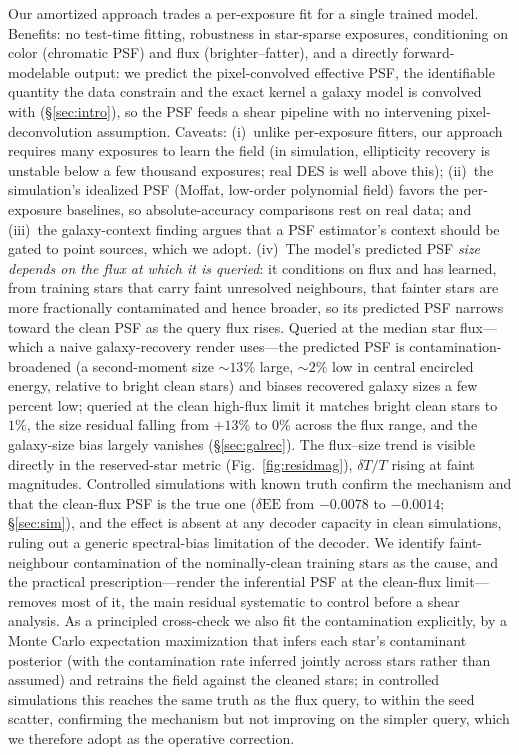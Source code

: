 \documentclass[twocolumn]{aastex701}
\begin{document}
Our amortized approach trades a per-exposure fit for a single trained model. Benefits: no
test-time fitting, robustness in star-sparse exposures, conditioning on color
(chromatic PSF) and flux (brighter--fatter), and a directly forward-modelable output: we
predict the pixel-convolved effective PSF, the identifiable quantity the data constrain
and the exact kernel a galaxy model is convolved with (\S\ref{sec:intro}), so the PSF
feeds a shear pipeline with no intervening pixel-deconvolution assumption. Caveats: (i)~unlike per-exposure fitters, our
approach requires many exposures to learn the field (in simulation, ellipticity
recovery is unstable below a few thousand exposures; real DES is well above this);
(ii)~the simulation's idealized PSF (Moffat, low-order polynomial field) favors the
per-exposure baselines, so absolute-accuracy comparisons rest on real data; and
(iii)~the galaxy-context finding argues that a PSF estimator's context should be gated to
point sources, which we adopt. (iv)~The model's predicted PSF \emph{size depends on the
flux at which it is queried}: it conditions on flux and has learned, from training stars
that carry faint unresolved neighbours, that fainter stars are more fractionally
contaminated and hence broader, so its predicted PSF narrows toward the clean PSF as the
query flux rises. Queried at the median star flux---which a naive galaxy-recovery render
uses---the predicted PSF is contamination-broadened (a second-moment size ${\sim}13\%$
large, ${\sim}2\%$ low in central encircled energy, relative to bright clean stars) and
biases recovered galaxy sizes a few percent low; queried at the clean high-flux limit it
matches bright clean stars to $1\%$, the size residual falling from $+13\%$ to $0\%$ across
the flux range, and the galaxy-size bias largely vanishes (\S\ref{sec:galrec}). The
flux--size trend is visible directly in the reserved-star metric (Fig.~\ref{fig:residmag}),
$\delta T/T$ rising at faint magnitudes. Controlled simulations with known truth confirm the
mechanism and that the clean-flux PSF is the true one ($\delta\mathrm{EE}$ from $-0.0078$ to
$-0.0014$; \S\ref{sec:sim}), and the effect is absent at any decoder capacity in clean
simulations, ruling out a generic spectral-bias limitation of the decoder. We identify
faint-neighbour contamination of the nominally-clean training stars as the cause, and the
practical prescription---render the inferential PSF at the clean-flux limit---removes most
of it, the main residual systematic to control before a shear analysis. As a principled
cross-check we also fit the contamination explicitly, by a Monte Carlo expectation
maximization \citep{dempster1977em,wei1990mcem} that infers each star's contaminant
posterior (with the contamination rate inferred jointly across stars rather than assumed)
and retrains the field against the cleaned stars; in controlled simulations this reaches the
same truth as the flux query, to within the seed scatter, confirming the mechanism but not
improving on the simpler query, which we therefore adopt as the operative correction.
\end{document}
